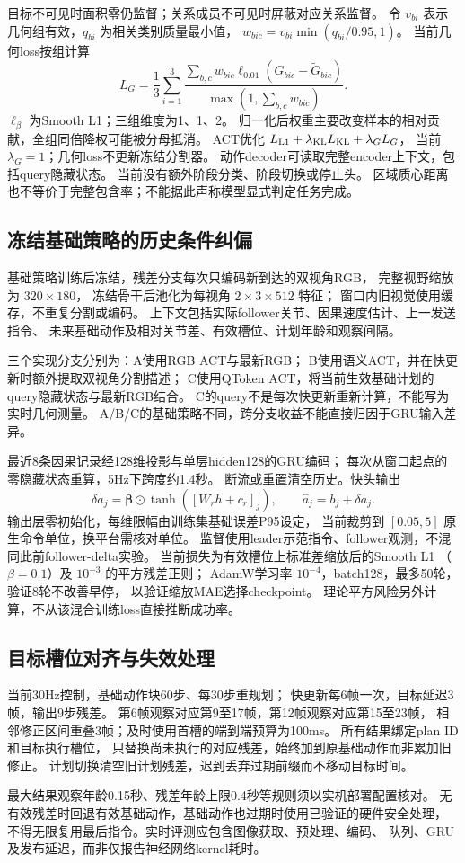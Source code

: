 目标不可见时面积零仍监督；关系成员不可见时屏蔽对应关系监督。
令 $v_{bi}$ 表示几何组有效，$q_{bi}$ 为相关类别质量最小值，
$w_{bic}=v_{bi}\min(q_{bi}/0.95,1)$。
当前几何loss按组计算
\begin{equation}
 L_G=\frac13\sum_{i=1}^3
 \frac{\sum_{b,c}w_{bic}\ell_{0.01}(\widehat G_{bic}-\widetilde G_{bic})}
 {\max(1,\sum_{b,c}w_{bic})}.
\end{equation}
$\ell_\beta$ 为Smooth L1；三组维度为1、1、2。
归一化后权重主要改变样本的相对贡献，全组同倍降权可能被分母抵消。
ACT优化 $L_{\rm L1}+\lambda_{\rm KL}L_{\rm KL}+\lambda_G L_G$，
当前 $\lambda_G=1$；几何loss不更新冻结分割器。
动作decoder可读取完整encoder上下文，包括query隐藏状态。
当前没有额外阶段分类、阶段切换或停止头。
区域质心距离也不等价于完整包含率；不能据此声称模型显式判定任务完成。

\subsection{冻结基础策略的历史条件纠偏}
基础策略训练后冻结，残差分支每次只编码新到达的双视角RGB，
完整视野缩放为 $320\times180$，
冻结骨干后池化为每视角 $2\times3\times512$ 特征；
窗口内旧视觉使用缓存，不重复分割或编码。
上下文包括实际follower关节、因果速度估计、上一发送指令、
未来基础动作及相对关节差、有效槽位、计划年龄和观察间隔。

三个实现分支分别为：A使用RGB ACT与最新RGB；
B使用语义ACT，并在快更新时额外提取双视角分割描述；
C使用QToken ACT，将当前生效基础计划的query隐藏状态与最新RGB结合。
C的query不是每次快更新重新计算，不能写为实时几何测量。
A/B/C的基础策略不同，跨分支收益不能直接归因于GRU输入差异。

最近8条因果记录经128维投影与单层hidden128的GRU编码；
每次从窗口起点的零隐藏状态重算，5Hz下跨度约1.4秒。
断流或重置清空历史。快头输出
\begin{equation}
 \delta a_j=\bm\beta\odot\tanh([W_rh+c_r]_j),\qquad
 \widehat a_j=b_j+\delta a_j.
\end{equation}
输出层零初始化，每维限幅由训练集基础误差P95设定，
当前裁剪到 $[0.05,5]$ 原生命令单位，换平台需核对单位。
监督使用leader示范指令、follower观测，不混同此前follower-delta实验。
当前损失为有效槽位上标准差缩放后的Smooth L1
（$\beta=0.1$）及 $10^{-3}$ 的平方残差正则；
AdamW学习率 $10^{-4}$，batch128，最多50轮，验证8轮不改善早停，
以验证缩放MAE选择checkpoint。
理论平方风险另外计算，不从该混合训练loss直接推断成功率。

\subsection{目标槽位对齐与失效处理}
当前30Hz控制，基础动作块60步、每30步重规划；
快更新每6帧一次，目标延迟3帧，输出9步残差。
第6帧观察对应第9至17帧，第12帧观察对应第15至23帧，
相邻修正区间重叠3帧；及时使用首槽的端到端预算为100ms。
所有结果绑定plan ID和目标执行槽位，
只替换尚未执行的对应残差，始终加到原基础动作而非累加旧修正。
计划切换清空旧计划残差，迟到丢弃过期前缀而不移动目标时间。

最大结果观察年龄0.15秒、残差年龄上限0.4秒等规则须以实机部署配置核对。
无有效残差时回退有效基础动作，基础动作也过期时使用已验证的硬件安全处理，
不得无限复用最后指令。实时评测应包含图像获取、预处理、编码、
队列、GRU及发布延迟，而非仅报告神经网络kernel耗时。
